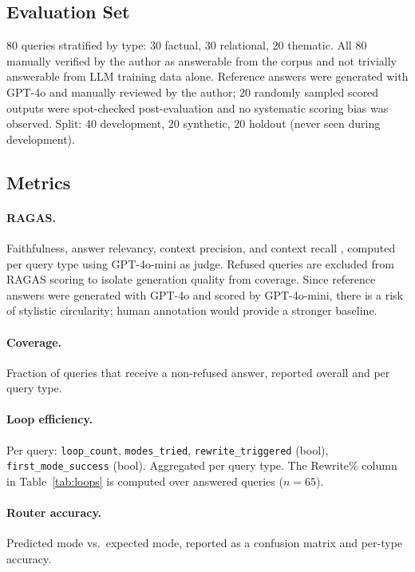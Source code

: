 \documentclass[11pt]{article}
\begin{document}
\subsection{Evaluation Set}

80 queries stratified by type: 30 factual, 30 relational, 20 thematic. All
80 manually verified by the author as answerable from the corpus and not
trivially answerable from LLM training data alone. Reference answers were
generated with GPT-4o and manually reviewed by the author; 20 randomly
sampled scored outputs were spot-checked post-evaluation and no systematic
scoring bias was observed. Split: 40 development, 20 synthetic, 20 holdout
(never seen during development).

\subsection{Metrics}

\paragraph{RAGAS.}
Faithfulness, answer relevancy, context precision, and context recall
\cite{es2023ragas}, computed per query type using GPT-4o-mini as judge.
Refused queries are excluded from RAGAS scoring to isolate generation
quality from coverage. Since reference answers were generated with GPT-4o
and scored by GPT-4o-mini, there is a risk of stylistic circularity; human
annotation would provide a stronger baseline.

\paragraph{Coverage.}
Fraction of queries that receive a non-refused answer, reported overall and
per query type.

\paragraph{Loop efficiency.}
Per query: \texttt{loop\_count}, \texttt{modes\_tried},
\texttt{rewrite\_triggered} (bool), \texttt{first\_mode\_success} (bool).
Aggregated per query type. The Rewrite\% column in
Table~\ref{tab:loops} is computed over answered queries ($n=65$).

\paragraph{Router accuracy.}
Predicted mode vs.\ expected mode, reported as a confusion matrix and
per-type accuracy.
\end{document}

